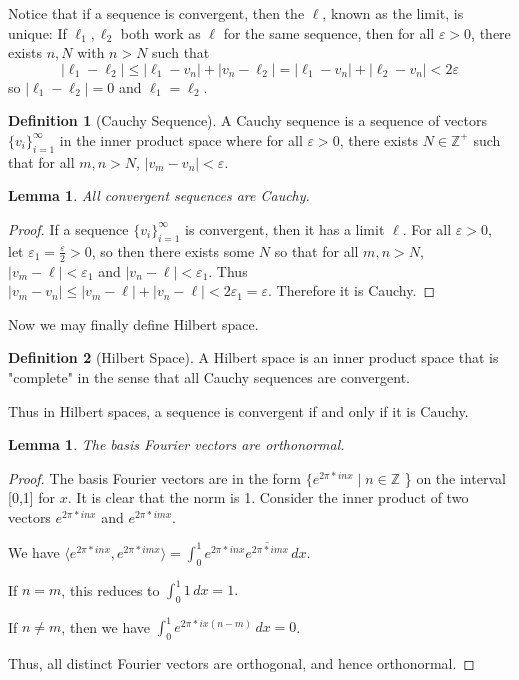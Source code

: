\documentclass{article}
\newtheorem{lemma}[theorem]{Lemma}
\theoremstyle{definition}
\newtheorem{definition}{Definition}[section]
\theoremstyle{definition}
\theoremstyle{definition}
\begin{document}
Notice that if a sequence is convergent, then the $\ell$, known as the limit, is unique: If $\ell_1,\ell_2$ both work as $\ell$ for the same sequence, then for all $\varepsilon>0$, there exists $n,N$ with $n>N$ such that 
$$|\ell_1-\ell_2|\leq|\ell_1-v_n|+|v_n-\ell_2|=|\ell_1-v_n|+|\ell_2-v_n|<2\varepsilon$$
so $|\ell_1-\ell_2|=0$ and $\ell_1=\ell_2$.

\begin{definition} [Cauchy Sequence]
    A Cauchy sequence is a sequence of vectors $\{v_i\}_{i=1}^\infty$ in the inner product space where for all $\varepsilon>0$, there exists $N\in\mathbb{Z}^+$ such that for all $m,n>N$, $|v_m-v_n|<\varepsilon$. 
\end{definition}

\begin{lemma}
All convergent sequences are Cauchy.
\end{lemma}
\begin{proof}
  If a sequence $\{v_i\}_{i=1}^\infty$ is convergent, then it has a limit $\ell$. For all $\varepsilon>0$, let $\varepsilon_1=\frac{\varepsilon}{2}>0$, so then there exists some $N$ so that for all $m,n>N$, $|v_m-\ell|<\varepsilon_1$ and $|v_n-\ell|<\varepsilon_1$. Thus $|v_m-v_n|\leq|v_m-\ell|+|v_n-\ell|<2\varepsilon_1=\varepsilon$. Therefore it is Cauchy.
\end{proof}

Now we may finally define Hilbert space.
\begin{definition} [Hilbert Space]
    A Hilbert space is an inner product space that is "complete" in the sense that all Cauchy sequences are convergent.
\end{definition}

Thus in Hilbert spaces, a sequence is convergent if and only if it is Cauchy.

 
\begin{lemma}
The basis Fourier vectors are orthonormal.
\end{lemma}

\begin{proof}
The basis Fourier vectors are in the form $\{ e^{2\pi*inx} \mid n \in \mathbb{Z}$ \} on the interval [0,1] for $x$. It is clear that the norm is 1. Consider the inner product of two vectors $e^{2\pi*inx}$ and $e^{2\pi*imx}$.

We have $\langle e^{2\pi*inx},e^{2\pi*imx}\rangle = \int_{0}^{1} e^{2\pi*inx}\overline{e^{2\pi*imx}} \, dx.$ 

If $n=m$, this reduces to $\int_{0}^{1} 1 \, dx = 1.$

If $n \neq  m$, then we have $\int_{0}^{1} e^{2\pi*ix(n-m)} \, dx = 0$. 

Thus, all distinct Fourier vectors are orthogonal, and hence orthonormal.
\end{proof}
\end{document}
